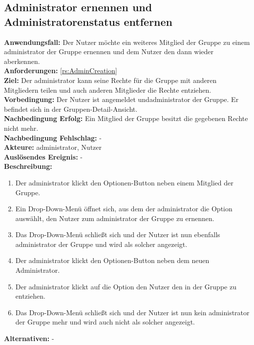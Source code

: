 \documentclass[parskip=full]{scrartcl}
\begin{document}
\subsection{Administrator ernennen und Administratorenstatus entfernen}
\textbf{Anwendungsfall:} Der Nutzer möchte ein weiteres Mitglied der Gruppe zu einem \gls{administrator} der Gruppe ernennen und dem Nutzer den  dann wieder aberkennen.\\
\textbf{Anforderungen:} \ref{rs:AdminCreation}\\
\textbf{Ziel:} Der \gls{administrator} kann seine Rechte für die Gruppe mit anderen Mitgliedern teilen und auch anderen Mitglieder die Rechte entziehen.\\
\textbf{Vorbedingung:} Der Nutzer ist angemeldet und\gls{administrator} der Gruppe. Er befindet sich in der Gruppen-Detail-Ansicht.\\
\textbf{Nachbedingung Erfolg:} Ein Mitglied der Gruppe besitzt die gegebenen Rechte nicht mehr.\\
\textbf{Nachbedingung Fehlschlag:} -\\
\textbf{Akteure:} \gls{administrator}, Nutzer \\
\textbf{Auslösendes Ereignis:} -\\
\textbf{Beschreibung:}
\begin{enumerate}
    \item Der \gls{administrator} klickt den Optionen-Button neben einem Mitglied der Gruppe.
    \item Ein Drop-Down-Menü öffnet sich, aus dem der \gls{administrator} die Option auswählt, den Nutzer zum \gls{administrator} der Gruppe zu ernennen.
    \item Das Drop-Down-Menü schließt sich und der Nutzer ist nun ebenfalls \gls{administrator} der Gruppe und wird als solcher angezeigt.
    \item Der \gls{administrator} klickt den Optionen-Button neben dem neuen Administrator.
    \item Der \gls{administrator} klickt auf die Option den Nutzer den  in der Gruppe zu entziehen.
    \item Das Drop-Down-Menü schließt sich und der Nutzer ist nun kein \gls{administrator} der Gruppe mehr und wird auch nicht als solcher angezeigt.
\end{enumerate}
\textbf{Alternativen:} -
\newpage
\end{document}

